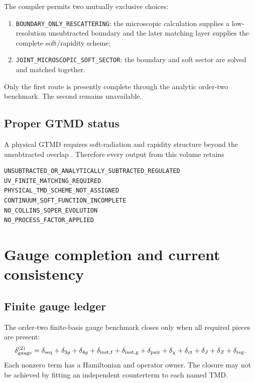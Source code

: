 \documentclass[11pt]{article}
\begin{document}
The compiler permits two mutually exclusive choices:
\begin{enumerate}
 \item \texttt{BOUNDARY\_ONLY\_RESCATTERING}: the microscopic calculation
 supplies a low-resolution unsubtracted boundary and the later matching layer
 supplies the complete soft/rapidity scheme;
 \item \texttt{JOINT\_MICROSCOPIC\_SOFT\_SECTOR}: the boundary and soft sector
 are solved and matched together.
\end{enumerate}
Only the first route is presently complete through the analytic order-two
benchmark.  The second remains unavailable.

\subsection{Proper GTMD status}

A physical GTMD requires soft-radiation and rapidity structure beyond the
unsubtracted overlap \cite{Echevarria2016}.  Therefore every output from this
volume retains
\begin{verbatim}
UNSUBTRACTED_OR_ANALYTICALLY_SUBTRACTED_REGULATED
UV_FINITE_MATCHING_REQUIRED
PHYSICAL_TMD_SCHEME_NOT_ASSIGNED
CONTINUUM_SOFT_FUNCTION_INCOMPLETE
NO_COLLINS_SOPER_EVOLUTION
NO_PROCESS_FACTOR_APPLIED
\end{verbatim}

\section{Gauge completion and current consistency}
\label{sec:gauge}

\subsection{Finite gauge ledger}

The order-two finite-basis gauge benchmark closes only when all required
pieces are present:
\begin{equation}
 \delta_{\rm gauge}^{(2)}
 =\delta_{\rm seq}
 +\delta_{3g}
 +\delta_{4g}
 +\delta_{\rm inst,f}
 +\delta_{\rm inst,g}
 +\delta_{\rm pair}
 +\delta_{\chi}
 +\delta_{\rm ct}
 +\delta_J
 +\delta_Z
 +\delta_{\rm reg}.
 \label{eq:gauge-ledger}
\end{equation}
Each nonzero term has a Hamiltonian and operator owner.  The closure may not be
achieved by fitting an independent counterterm to each named TMD.
\end{document}

